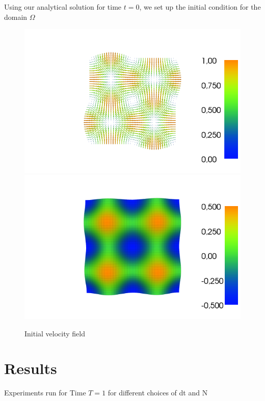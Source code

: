 \documentclass[a4paper,norsk]{article}
\begin{document}
Using our analytical solution for time $t = 0$, we set up the initial condition
for the domain $\Omega$

\begin{figure}[h!]
	\centering
	\caption*{Initial velocity field}
	\includegraphics[scale=0.32]{2D/initial.png}
    \includegraphics[scale=0.32]{2D/initpress.png}
\end{figure}


\section*{Results}
Experiments run for Time $T = 1$ for different choices of dt and N
\end{document}
